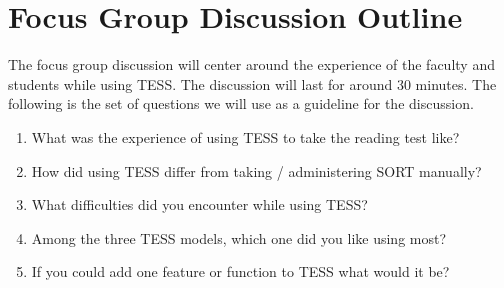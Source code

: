 \section{Focus Group Discussion Outline}
The focus group discussion will center around the experience of the faculty and students while using TESS. The discussion will last for around 30 minutes. The following is the set of questions we will use as a guideline for the discussion. 

\begin{enumerate}
\item What was the experience of using TESS to take the reading test like?
\item How did using TESS differ from taking / administering SORT manually?
\item What difficulties did you encounter while using TESS?
\item Among the three TESS models, which one did you like using most?
\item If you could add one feature or function to TESS what would it be?
\end{enumerate}
